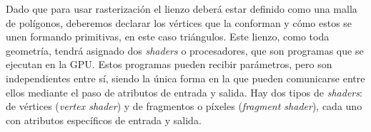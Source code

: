     
    
    
    
Dado que para usar rasterización el lienzo deberá estar definido como una malla de polígonos, deberemos declarar los vértices que la conforman y cómo estos se unen formando primitivas, en este caso triángulos. Este lienzo, como toda geometría, tendrá asignado dos \textit{shaders} o procesadores, que son programas que se ejecutan en la GPU. Estos programas pueden recibir parámetros, pero son independientes entre sí, siendo la única forma en la que pueden comunicarse entre ellos mediante el paso de atributos de entrada y salida. Hay dos tipos de \textit{shaders}: de vértices (\textit{vertex shader}) y de fragmentos o píxeles (\textit{fragment shader}), cada uno con atributos específicos de entrada y salida.\newline

